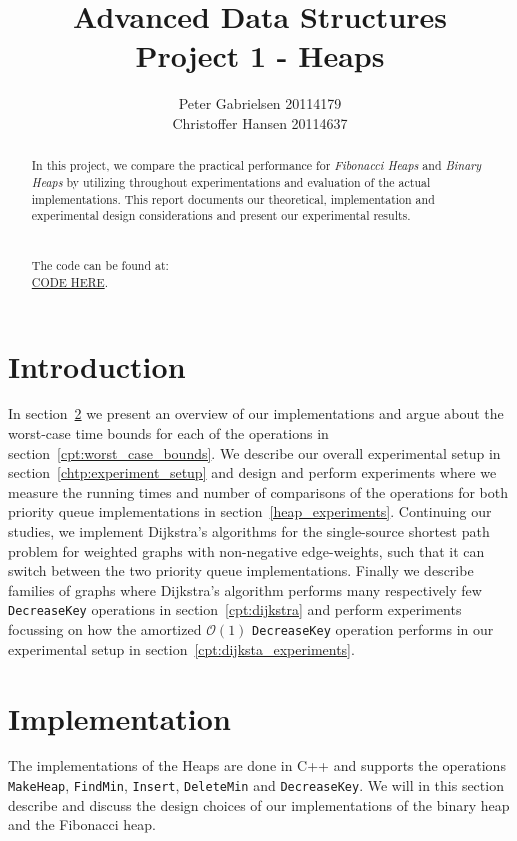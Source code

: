 \documentclass[a4paper,oneside,article,11pt]{memoir}
\title{Advanced Data Structures \\ Project 1 - Heaps}
\author{Peter Gabrielsen 20114179 \\
Christoffer Hansen 20114637}
\begin{document}
\begin{titlingpage}
\clearpage

\maketitle
\thispagestyle{empty}

\begin{abstract}
In this project, we compare the practical performance for \textit{Fibonacci Heaps} and \textit{Binary Heaps} by utilizing throughout experimentations and evaluation of the actual implementations. This report documents our theoretical, implementation and experimental design considerations and present our experimental results.\\
\\
\\
The code can be found at: \\\url{CODE HERE}.
\end{abstract}
\end{titlingpage}

\pagebreak

\tableofcontents

\pagebreak

\chapter{Introduction}
In section~\ref{cpt:implementation} we present an overview of our implementations and argue about the worst-case time bounds for each of the operations in section~\ref{cpt:worst_case_bounds}. We describe our overall experimental setup in section~\ref{chtp:experiment_setup} and design and perform experiments where we measure the running times and number of comparisons of the operations for both priority queue implementations in section~\ref{heap_experiments}. Continuing our studies, we implement Dijkstra's algorithms for the single-source shortest path problem for weighted graphs with non-negative edge-weights, such that it can switch between the two priority queue implementations. Finally we describe families of graphs where Dijkstra's algorithm performs many respectively few \texttt{DecreaseKey} operations in section~\ref{cpt:dijkstra} and perform experiments focussing on how the amortized $\mathcal{O}(1)$ \texttt{DecreaseKey} operation performs in our experimental setup in section~\ref{cpt:dijksta_experiments}.

\chapter{Implementation}
\label{cpt:implementation}
The implementations of the Heaps are done in C++ and supports the operations \texttt{MakeHeap}, \texttt{FindMin}, \texttt{Insert}, \texttt{DeleteMin} and \texttt{DecreaseKey}. We will in this section describe and discuss the design choices of our implementations of the binary heap and the Fibonacci heap.
\end{document}

